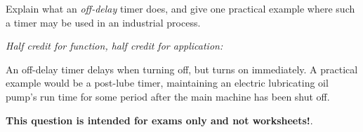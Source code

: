 

Explain what an {\it off-delay} timer does, and give one practical example where such a timer may be used in an industrial process.







{\it Half credit for function, half credit for application:}

\vskip 10pt

An off-delay timer delays when turning off, but turns on immediately.  A practical example would be a post-lube timer, maintaining an electric lubricating oil pump's run time for some period after the main machine has been shut off.







{\bf This question is intended for exams only and not worksheets!}.


